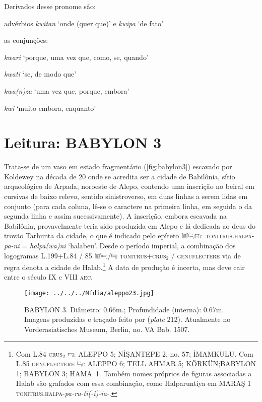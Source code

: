\noindent Derivados desse pronome são:
\begin{compactitem}
	\item advérbios \emph{kwitan} `onde (quer que)' e \emph{kwipa} `de fato'
	\item as conjunções:
	\begin{compactitem}
		\item \emph{kwari} `porque, uma vez que, como, se, quando'
		\item \emph{kwati} `se, de modo que'
		\item \emph{kwa{(n)}za} `uma vez que, porque, embora'
		\item \emph{kwi} `muito embora, enquanto'
	\end{compactitem}
\end{compactitem}


\clearpage

\section{Leitura: BABYLON 3}

Trata-se de um vaso em estado fragmentário (\autoref{fig:babylon3}) escavado por
Koldewey na década de 20 onde se acredita ser a cidade de Babilônia, sítio
arqueológico de Arpada, noroeste de Alepo, contendo uma inscrição no
beiral em cursivas de baixo relevo, sentido sinistroverso, em duas linhas a
serem lidas em conjunto (para cada coluna, lê-se o caractere na primeira linha,
em seguida o da segunda linha e assim sucessivamente).
A inscrição, embora escavada na Babilônia, provavelmente teria sido
produzida em Alepo e lá dedicada ao deus do trovão Tarhunta da cidade, o que é
indicado pelo epíteto 𔓢𔑞𔕸𔗐 \textsc{tonitrus.halpa}-\textit{pa-ni}
= \textit{halpa{(wa)}ni} `halabeu'. Desde o período imperial,
a combinação dos logogramas L.199+L.84 \slash{} 85 𔓢𔑝\slash{}𔑞
\textsc{tonitrus+crus$_2$ \slash{} genuflectere}
via de regra denota a cidade de Halab.\footnote{Com L.84
\textsc{crus}$_2$ 𔑝: ALEPPO 5; NİŞANTEPE 2, no. 57; İMAMKULU.\@
Com L.85 \textsc{genuflectere} 𔑞:  ALEPPO 6; TELL AHMAR 5;
KÖRKÜN;\@ BABYLON 1; BABYLON 3; \mbox{HAMA 1}.\@
Também nomes próprios de figuras associadas a Halab são grafados com essa
combinação, como Halparuntiya em
MARAŞ 1 \textsc{tonitrus.halpa}-\textit{pa-ru-ti{(-i)}-ia-}.
}
A data de produção é incerta, mas deve cair entre o século IX e VIII
\textsc{aec}.

\vfill

\begin{figure}[!htb]
	\texttt{[image: ../../../Mídia/aleppo23.jpg]}
	\caption[BABYLON 3]{
		BABYLON 3. Diâmetro: 0.66m.; Profundidade
		(interna): 0.67m. Imagens produzidas e traçado feito por
		 (\emph{plate} 212). Atualmente no
		\foreignlanguage{german}{Vorderasiatisches Museum}, Berlin,
		no. VA Bab. 1507.
	}\label{fig:babylon3}
\end{figure}

